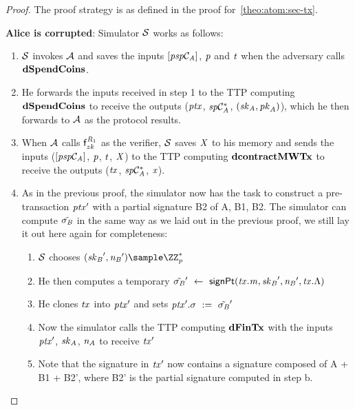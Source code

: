 \begin{proof}
    The proof strategy is as defined in the proof for~\cref{theo:atom:sec-tx}.

    \textbf{Alice is corrupted}: Simulator $\mathcal{S}$ works as follows:
    \begin{enumerate}
        \item $\mathcal{S}$ invokes $\mathcal{A}$ and saves the inputs $[\mathit{psp}\mathcal{C}_{\mathit{A}}]$, $\mathit{p}$ and $\mathit{t}$ when the adversary calls $\mathbf{dSpendCoins}$.
        \item He forwards the inputs received in step 1 to the TTP computing $\mathbf{dSpendCoins}$ to receive the outputs ($\mathit{ptx}$, $\mathit{sp}\mathcal{C}_{\mathit{A}}^*$, $(\mathit{sk}_{\mathit{A}}, \mathit{pk}_{\mathit{A}})$), which he then forwards to $\mathcal{A}$ as the protocol results.
        \item When $\mathcal{A}$ calls $\mathsf{f}^{\mathit{R}_1}_{zk}$ as the verifier, $\mathcal{S}$ saves $\mathit{X}$ to his memory and sends the inputs ($[\mathit{psp}\mathcal{C}_{\mathit{A}}]$, $\mathit{p}$, $\mathit{t}$, $\mathit{X}$) to the TTP computing $\mathbf{dcontractMWTx}$ to receive the outputs ($\mathit{tx}$, $\mathit{sp}\mathcal{C}_{\mathit{A}}^*$, $\mathit{x}$).
        \item As in the previous proof, the simulator now has the task to construct a pre-transaction ${\mathit{ptx}}'$ with a partial signature B2 of A, B1, B2.
        The simulator can compute $\tilde{\sigma_{\mathit{B}}}$ in the same way as we laid out in the previous proof, we still lay it out here again for completeness:
        \begin{enumerate}
            \item $\mathcal{S}$ chooses $(\funStarAlt{\varSecKeyBob}, \funStarAlt{\varNonceBob}) \sample \cnstIntegersPrimeWithoutZero{\varPrime}$
            \item He then computes a temporary ${\tilde{\sigma_{\mathit{B}}}}' ~\leftarrow~ \mathsf{signPt}(\mathit{tx}.\mathit{m}, {\mathit{sk}_{\mathit{B}}}', {\mathit{\mathit{n}_{\mathit{B}}}}', \mathit{tx}.\Lambda)$
            \item He clones $\mathit{tx}$ into ${\mathit{ptx}}'$ and sets ${\mathit{ptx}}'.\sigma ~:=~ {\tilde{\sigma_{\mathit{B}}}}'$
            \item Now the simulator calls the TTP computing $\mathbf{dFinTx}$ with the inputs ${\mathit{ptx}}'$, $\mathit{sk}_{\mathit{A}}$, $\mathit{\mathit{n}_{\mathit{A}}}$ to receive ${\mathit{tx}}'$
            \item Note that the signature in ${\mathit{tx}}'$ now contains a signature composed of A + B1 + B2', where B2' is the partial signature computed in step b.

\end{enumerate}
\end{enumerate}
\end{proof}
